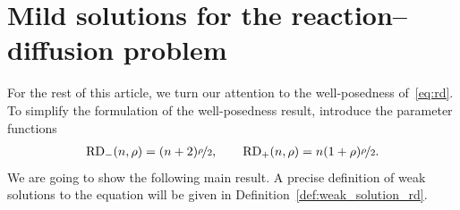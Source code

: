 \documentclass[11pt, leqno]{amsart}
\theoremstyle{definition}
\newcommand{\RD}{\mathrm{RD}}
\begin{document}
	\section{Mild solutions for the reaction--diffusion problem}
	\label{sec:mild}

	For the rest of this article, we turn our attention to the well-posedness of~\eqref{eq:rd}.
	To simplify the formulation of the well-posedness result, introduce the parameter functions
	\begin{align}
		\RD_{-}(n,\rho) = (n+2) \nicefrac{\rho}{2}, \qquad
		\RD_+(n,\rho) = n(1+\rho) \nicefrac{\rho}{2}.
	\end{align}
	We are going to show the following main result. A precise definition of weak solutions to the equation will be given in Definition~\ref{def:weak_solution_rd}.
\end{document}
